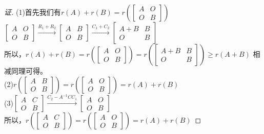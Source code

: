 \documentclass[10pt,a4paper]{report}
\begin{document}
\begin{proof}[证]
	(1)首先我们有$r(A)+r(B) = r(\left[
	\begin{matrix}
	A & O\\
	O & B
	\end{matrix}
	\right])$\\
	$\left[
	\begin{matrix}
	A & O\\
	O & B
	\end{matrix}
	\right] \xrightarrow{R_{1}+R_{2}} \left[
	\begin{matrix}
	A & B\\
	O & B
	\end{matrix}
	\right] \xrightarrow{C_{1}+C_{2}}
	\left[
	\begin{matrix}
	A+B & B\\
	O & B
	\end{matrix}
	\right]$\\
	所以，$r(A)+r(B) = r(\left[
	\begin{matrix}
	A & O\\
	O & B
	\end{matrix}
	\right]) = r(\left[
	\begin{matrix}
	A+B & B\\
	O & B
	\end{matrix}
	\right]) \geq r(A+B)$
	相减同理可得。\\
	(2)$r(\left[
	\begin{matrix}
	A & B\\
	O & B
	\end{matrix}
	\right]) = r(\left[
	\begin{matrix}
	A & O\\
	O & B
	\end{matrix}
	\right]) = r(A)+r(B)$\\
	(3)$\left[
	\begin{matrix}
	A & C\\
	O & B
	\end{matrix}
	\right] \xrightarrow{C_{2}-A^{-1}CC_{1}}
	\left[
	\begin{matrix}
	A & O\\
	O & B
	\end{matrix}
	\right]$\\
	所以，$r(\left[
	\begin{matrix}
	A & C\\
	O & B
	\end{matrix}
	\right]) = r(\left[
	\begin{matrix}
	A & O\\
	O & B
	\end{matrix}
	\right]) = r(A)+r(B)$
\end{proof}
\end{document}
